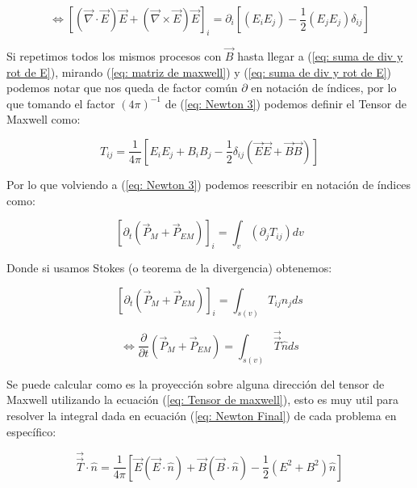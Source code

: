 \documentclass[]{article}
\begin{document}
\begin{equation}
    \Leftrightarrow
    \left[
    (\vec{\nabla} \cdot \vec{E}) \vec{E} + (\vec{\nabla} \times \vec{E}) \vec{E}
    \right]_i =
    \partial_i \left[
    (E_i E_j) - \frac{1}{2} (E_j E_j)\delta_{ij}
    \right]
    \label{eq: suma de div y rot de E}
\end{equation}

Si repetimos todos los mismos procesos con $\vec{B}$ hasta llegar a (\ref{eq: suma de div y rot de E}),
mirando (\ref{eq: matriz de maxwell}) y (\ref{eq: suma de div y rot de E}) podemos notar que nos queda de 
factor común $\partial$ en notación de índices, por lo que tomando el factor $(4 \pi)^{-1}$ de 
(\ref{eq: Newton 3}) podemos definir el Tensor de Maxwell como:

\begin{equation}
    T_{ij} = \frac{1}{4 \pi} \left[
    E_i E_j + B_i B_j - \frac{1}{2} \delta_{ij}(\vec{E}\vec{E} + \vec{B}\vec{B})
    \right]
    \label{eq: Tensor de maxwell}
\end{equation}

Por lo que volviendo a (\ref{eq: Newton 3}) podemos reescribir en notación de índices como:

\begin{equation*}
    \left[
    \partial_t (\vec{P}_M + \vec{P}_{EM})
    \right]_i = 
    \int_{v}^{} (\partial_j T_{ij}) dv
\end{equation*}

Donde si usamos Stokes (o teorema de la divergencia) obtenemos:

\begin{equation*}
    \left[
    \partial_t (\vec{P}_M + \vec{P}_{EM})
    \right]_i = 
    \int_{s(v)}^{} T_{ij} n_j ds
\end{equation*}

\begin{equation}
    \Leftrightarrow
    \frac{\partial}{\partial t} (\vec{P}_M + \vec{P}_{EM}) = 
    \int_{s(v)}^{} \vec{\vec{T}} \hat{n} ds
    \label{eq: Newton Final}
\end{equation}

Se puede calcular como es la proyección sobre alguna dirección del
tensor de Maxwell utilizando la ecuación (\ref{eq: Tensor de maxwell}), esto es
muy util para resolver la integral dada en ecuación (\ref{eq: Newton Final}) de 
cada problema en específico:

\begin{equation}
    \vec{\vec{T}} \cdot \hat{n} =
    \frac{1}{4 \pi} \left[
        \vec{E} \left(\vec{E} \cdot \hat{n}\right) +
        \vec{B} \left(\vec{B} \cdot \hat{n}\right) -
        \frac{1}{2} \left(E^2 + B^2\right) \hat{n}
    \right]
\end{equation}
\end{document}
